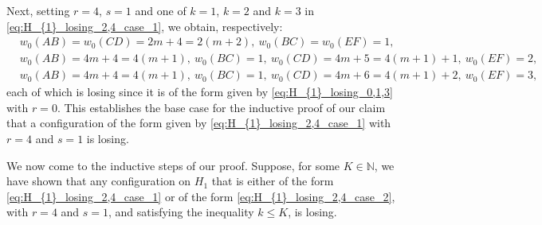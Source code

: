\documentclass[11pt,reqno]{amsart}
\theoremstyle{definition}
\theoremstyle{definition}
\begin{document}
Next, setting $r=4$, $s=1$ and one of $k=1$, $k=2$ and $k=3$ in \eqref{eq:H_{1}_losing_2,4_case_1}, we obtain, respectively:
\begin{align}
{}&w_{0}(AB)=w_{0}(CD)=2m+4=2(m+2),\ w_{0}(BC)=w_{0}(EF)=1,\nonumber\\
{}&w_{0}(AB)=4m+4=4(m+1),\ w_{0}(BC)=1,\ w_{0}(CD)=4m+5=4(m+1)+1,\ w_{0}(EF)=2,\nonumber\\
{}&w_{0}(AB)=4m+4=4(m+1),\ w_{0}(BC)=1,\ w_{0}(CD)=4m+6=4(m+1)+2,\ w_{0}(EF)=3,\nonumber
\end{align}
each of which is losing since it is of the form given by \eqref{eq:H_{1}_losing_0,1,3} with $r=0$. This establishes the base case for the inductive proof of our claim that a configuration of the form given by \eqref{eq:H_{1}_losing_2,4_case_1} with $r=4$ and $s=1$ is losing.

We now come to the inductive steps of our proof. Suppose, for some $K \in \mathbb{N}$, we have shown that any configuration on $H_{1}$ that is either of the form \eqref{eq:H_{1}_losing_2,4_case_1} or of the form \eqref{eq:H_{1}_losing_2,4_case_2}, with $r=4$ and $s=1$, and satisfying the inequality $k \leqslant K$, is losing. 
\end{document}
